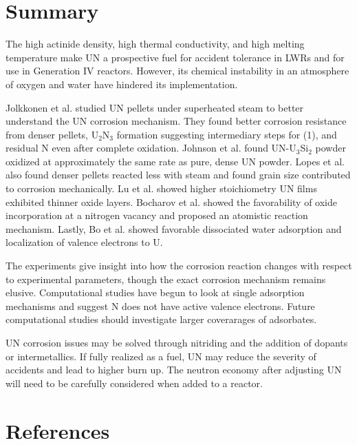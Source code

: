 \documentclass[3p,review,11pt]{elsarticle}
\begin{document}
\section{Summary}
The high actinide density, high thermal conductivity, and high melting temperature make UN a prospective fuel for accident tolerance in LWRs and for use in Generation IV reactors. However, its chemical instability in an atmosphere of oxygen and water have hindered its implementation. 
\par Jolkkonen et al. \cite{Jolkkonen2017} studied UN pellets under superheated steam to better understand the UN corrosion mechanism. They found better corrosion resistance from denser pellets, U$_{2}$N$_{3}$ formation suggesting intermediary steps for (1), and residual N even after complete oxidation. Johnson et al. \cite{Johnson2016} found UN-U$_{3}$Si$_{2}$ powder oxidized at approximately the same rate as pure, dense UN powder. Lopes et al. \cite{Lopes2017} also found denser pellets reacted less with steam and found grain size contributed to corrosion mechanically. Lu et al. showed higher stoichiometry UN films exhibited thinner oxide layers. Bocharov et al. \cite{Bocharov2013} showed the favorability of oxide incorporation at a nitrogen vacancy and proposed an atomistic reaction mechanism. Lastly, Bo et al. \cite{Bo2016} showed favorable dissociated water adsorption and localization of valence electrons to U.
\par The experiments give insight into how the corrosion reaction changes with respect to experimental parameters, though the exact corrosion mechanism remains elusive. Computational studies have begun to look at single adsorption mechanisms and suggest N does not have active valence electrons. Future computational studies should investigate larger coverarages of adsorbates. 
\par UN corrosion issues may be solved through nitriding and the addition of dopants or intermetallics. If fully realized as a fuel, UN may reduce the severity of accidents and lead to higher burn up. The neutron economy after adjusting UN will need to be carefully considered when added to a reactor.











\section*{References}




\end{document}
